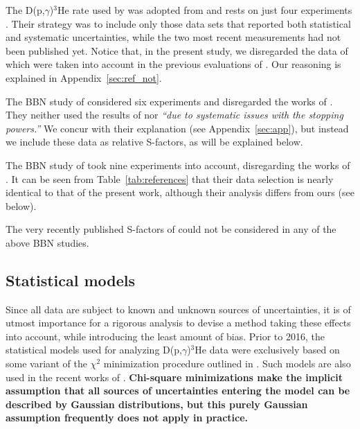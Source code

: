 \documentclass[twocolumn]{aastex63}
\begin{document}
The D(p,$\gamma$)$^3$He rate used by \citet{Pitrou2018} was adopted from \citet{iliadis16} and rests on just four experiments \citep{Sch97,Ma97,Cas02,Bys08}. Their strategy was to include only those data sets that reported both statistical and systematic uncertainties, while the two most recent measurements \citep{Tisma:2019ug,Mossa20} had not been published yet. Notice that, in the present study, we disregarded the data of \cite{Bys08} which were taken into account in the previous evaluations of \citet{Coc15,iliadis16}. Our reasoning is explained in Appendix~\ref{sec:ref_not}. 

The BBN study of \citet{Yeh21} considered six experiments and disregarded the works of \citet{Gri55,War63,Gri63,Gel67,Bai70,Bys08,Tisma:2019ug}. They neither used the results of \citet{Bai70} nor \citet{Gri63} {\it ``due to systematic issues with the stopping powers.''} We concur with their explanation (see Appendix~\ref{sec:app}), but instead we include these data as relative S-factors, as will be explained below. 

The BBN study of \citet{Pis21} took nine experiments into account, disregarding the works of \citet{Gri55,Wol67,Bai70,Bys08}. It can be seen from Table~\ref{tab:references} that their data selection is nearly identical to that of the present work, although their analysis differs from ours (see below). 

The very recently published S-factors of \cite{Turkat21} could not be considered in any of the above BBN studies.

\subsection{Statistical models} 
\label{sec:statmodel}
Since all data are subject to known and unknown sources of uncertainties, it
is of utmost importance for a rigorous analysis to devise a method taking these effects into account, while introducing the least amount of bias. Prior to 2016, the statistical models used for analyzing D(p,$\gamma$)$^3$He data were exclusively based on some variant of the $\chi^2$ minimization procedure outlined in \citet{dagostini}. Such models are also used in the recent works of \citet{Yeh21,Pis21}. {\bf Chi-square minimizations make the implicit assumption that all sources of uncertainties entering the model can be described by Gaussian distributions, but this purely Gaussian assumption frequently does not apply in practice.}
\end{document}

